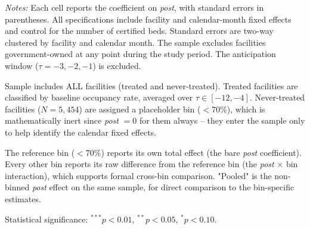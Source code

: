\documentclass[11pt]{article}
\begin{document}
\begin{table}[!ht]
\begin{threeparttable}
\begin{tablenotes}[flushleft]
\footnotesize
\item \textit{Notes:} Each cell reports the coefficient on \textit{post}, with standard errors in parentheses. All specifications include facility and calendar-month fixed effects and control for the number of certified beds. Standard errors are two-way clustered by facility and calendar month. The sample excludes facilities government-owned at any point during the study period. The anticipation window ($\tau = -3, -2, -1$) is excluded.
\item Sample includes ALL facilities (treated and never-treated). Treated facilities are classified by baseline occupancy rate, averaged over $\tau \in [-12,-4]$. Never-treated facilities ($N = 5,454$) are assigned a placeholder bin ($<$70\%), which is mathematically inert since \textit{post} $= 0$ for them always -- they enter the sample only to help identify the calendar fixed effects.
\item The reference bin ($<$70\%) reports its own total effect (the bare \textit{post} coefficient). Every other bin reports its raw difference from the reference bin (the \textit{post} $\times$ bin interaction), which supports formal cross-bin comparison. "Pooled" is the non-binned \textit{post} effect on the same sample, for direct comparison to the bin-specific estimates.
\item Statistical significance: $^{***}p<0.01$, $^{**}p<0.05$, $^{*}p<0.10$.
\end{tablenotes}

\end{threeparttable}
\end{table}
\end{document}
